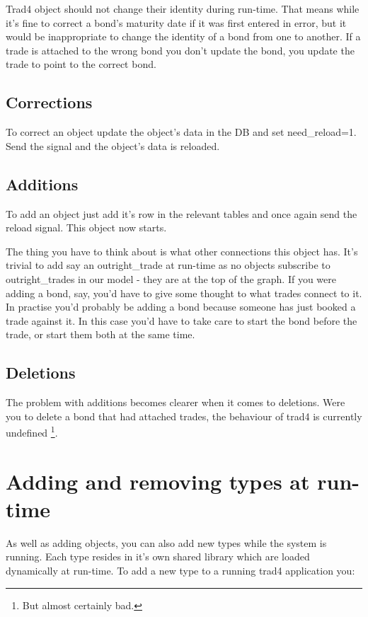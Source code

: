 \documentclass{report}
\begin{document}
Trad4 object should not change their identity during run-time. That means while it's fine to correct a bond's maturity date if it was first entered in error, but it would be inappropriate to change the identity of a bond from one to another. If a trade is attached to the wrong bond you don't update the bond, you update the trade to point to the correct bond.

\subsection{Corrections}

To correct an object update the object's data in the DB and set need_reload=1. Send the signal and the object's data is reloaded.

\subsection{Additions}

To add an object just add it's row in the relevant tables and once again send the reload signal. This object now starts. 

The thing you have to think about is what other connections this object has. It's trivial to add say an outright_trade at run-time as no objects subscribe to outright_trades in our model - they are at the top of the graph. If you were adding a bond, say, you'd have to give some thought to what trades connect to it.  In practise you'd probably be adding a bond because someone has just booked a trade against it. In this case you'd have to take care to start the bond before the trade, or start them both at the same time.

\subsection{Deletions}

The problem with additions becomes clearer when it comes to deletions. Were you to delete a bond that had attached trades, the behaviour of trad4 is currently undefined \footnote{But almost certainly bad.}.

\section{Adding and removing types at run-time}

As well as adding objects, you can also add new types while the system is running. Each type resides in it's own shared library which are loaded dynamically at run-time. To add a new type to a running trad4 application you:
\end{document}
